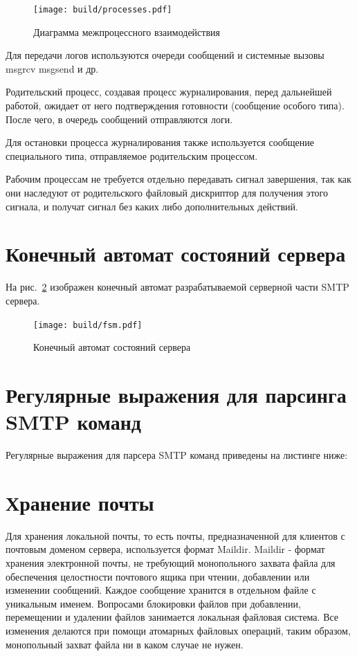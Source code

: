 \documentclass[a4paper,12pt]{report}
\begin{document}
\begin{figure}[H]
	\centering
	\texttt{[image: build/processes.pdf]}
	\caption{Диаграмма межпроцессного взаимодействия}
	\label{fig:processes}
\end{figure}

Для передачи логов используются очереди сообщений и системные вызовы msgrcv msgsend и др. 

Родительский процесс, создавая процесс журналирования, перед дальнейшей работой, ожидает от него подтверждения готовности (сообщение особого типа). После чего, в очередь сообщений отправляются логи. 

Для остановки процесса журналирования также используется сообщение специального типа, отправляемое родительским процессом.

Рабочим процессам не требуется отдельно передавать сигнал завершения, так как они наследуют от родительского файловый дискриптор для получения этого сигнала, и получат сигнал без каких либо дополнительных действий. 

\section{Конечный автомат состояний сервера}

На рис.~\ref{fig:fsm} изображен конечный автомат разрабатываемой серверной части SMTP сервера. 

\begin{figure}[H]
	\centering
	\texttt{[image: build/fsm.pdf]}
	\caption{Конечный автомат состояний сервера}
	\label{fig:fsm}
\end{figure}

\section{Регулярные выражения для парсинга SMTP команд}

Регулярные выражения для парсера SMTP команд приведены на листинге ниже: 



\section{Хранение почты}

Для хранения локальной почты, то есть почты, предназначенной для клиентов с почтовым доменом сервера, используется формат Maildir. Maildir - формат хранения электронной почты, не требующий монопольного захвата файла для обеспечения целостности почтового ящика при чтении, добавлении или изменении сообщений. Каждое сообщение хранится в отдельном файле с уникальным именем. Вопросами блокировки файлов при добавлении, перемещении и удалении файлов занимается локальная файловая система. Все изменения делаются при помощи атомарных файловых операций, таким образом, монопольный захват файла ни в каком случае не нужен.
\end{document}
